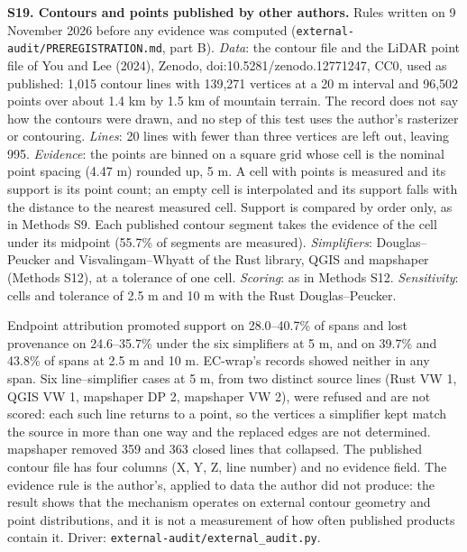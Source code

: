 \documentclass[11pt]{article}
\begin{document}
\vspace{4mm}
\noindent\textbf{S19. Contours and points published by other authors.} Rules written on 9 November 2026 before any evidence was computed (\texttt{external-audit/PREREGISTRATION.md}, part B). \emph{Data}: the contour file and the LiDAR point file of You and Lee (2024), Zenodo, doi:10.5281/zenodo.12771247, CC0, used as published: 1,015 contour lines with 139,271 vertices at a 20 m interval and 96,502 points over about 1.4 km by 1.5 km of mountain terrain. The record does not say how the contours were drawn, and no step of this test uses the author's rasterizer or contouring. \emph{Lines}: 20 lines with fewer than three vertices are left out, leaving 995. \emph{Evidence}: the points are binned on a square grid whose cell is the nominal point spacing (4.47 m) rounded up, 5 m. A cell with points is measured and its support is its point count; an empty cell is interpolated and its support falls with the distance to the nearest measured cell. Support is compared by order only, as in Methods S9. Each published contour segment takes the evidence of the cell under its midpoint (55.7\% of segments are measured). \emph{Simplifiers}: Douglas--Peucker and Visvalingam--Whyatt of the Rust library, QGIS and mapshaper (Methods S12), at a tolerance of one cell. \emph{Scoring}: as in Methods S12. \emph{Sensitivity}: cells and tolerance of 2.5 m and 10 m with the Rust Douglas--Peucker.

Endpoint attribution promoted support on 28.0--40.7\% of spans and lost provenance on 24.6--35.7\% under the six simplifiers at 5 m, and on 39.7\% and 43.8\% of spans at 2.5 m and 10 m. EC-wrap's records showed neither in any span. Six line--simplifier cases at 5 m, from two distinct source lines (Rust VW 1, QGIS VW 1, mapshaper DP 2, mapshaper VW 2), were refused and are not scored: each such line returns to a point, so the vertices a simplifier kept match the source in more than one way and the replaced edges are not determined. mapshaper removed 359 and 363 closed lines that collapsed. The published contour file has four columns (X, Y, Z, line number) and no evidence field. The evidence rule is the author's, applied to data the author did not produce: the result shows that the mechanism operates on external contour geometry and point distributions, and it is not a measurement of how often published products contain it. Driver: \texttt{external-audit/external\_audit.py}.
\end{document}
